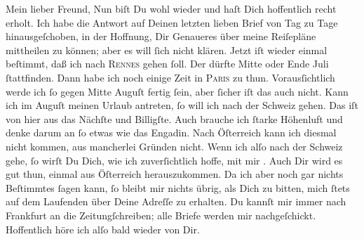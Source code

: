\pstart\center{}Mein lieber Freund,\pend\vspace{0.5em}
\pstart
           Nun biſt Du wohl wieder \label{K_L02878-1v}\label{K_L02878-1} und haſt Dich hoffentlich recht erholt. Ich habe die Antwort auf
               Deinen letzten lieben Brief von Tag zu Tage hinausgeſchoben, in der Hoffnung, Dir
               Genaueres über meine Reiſepläne mittheilen zu können; aber es will{ }ſich nicht klären.
               Jetzt iſt wieder einmal beſtimmt, daß ich nach \textsc{Rennes} gehen{ }ſoll. Der \label{K_L02878-2v}\label{K_L02878-2} dürfte Mitte oder Ende Juli{ }ſtattfinden. Dann habe ich noch einige Zeit in \textsc{Paris} zu thun. Vorausſichtlich werde ich{ }ſo gegen Mitte Auguſt fertig{ }ſein, aber{ }ſicher iſt das auch nicht. {\pb}Kann ich im Auguſt
               meinen Urlaub antreten,{ }ſo will ich nach der Schweiz gehen. Das iſt von hier aus das Nächſte und Billigſte. Auch brauche
               ich{ }ſtarke Höhenluft und denke darum an{ }ſo etwas wie das Engadin. Nach Öſterreich
               kann ich diesmal nicht kommen, aus mancherlei Gründen nicht. Wenn ich alſo nach der
                  Schweiz gehe,{ }ſo wirſt Du Dich, wie ich
               zuverſichtlich hoffe, mit mir \label{K_L02878-3v}\label{K_L02878-3}.
               Auch Dir wird es gut thun, einmal aus Öſterreich herauszukommen. Da ich aber noch gar nichts Beſtimmtes{ }ſagen
               kann,{ }ſo bleibt mir nichts übrig, als Dich zu bitten, mich{ }ſtets auf dem Laufenden
               über Deine Adreſſe zu erhalten. Du kannſt mir immer nach Frankfurt an die Zeitungſchreiben; alle Briefe werden mir nachgeſchickt. {\pb}Hoffentlich höre ich alſo bald wieder von Dir.\pend
           

